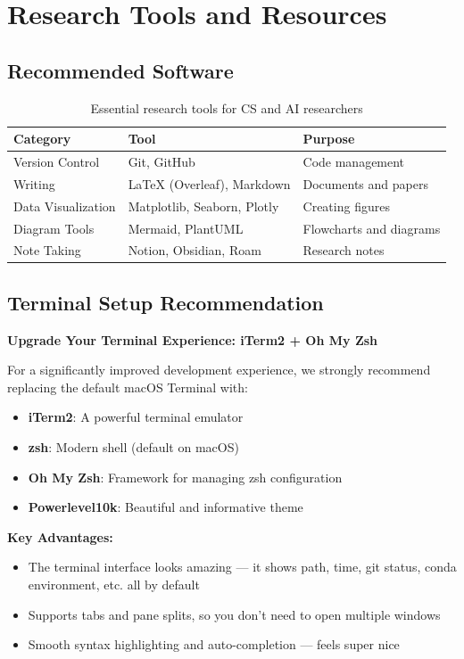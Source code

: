 \documentclass[11pt,a4paper]{article}
\begin{document}
\section{Research Tools and Resources}

\subsection{Recommended Software}
\begin{table}[H]
\centering
\begin{tabular}{@{}lll@{}}
\toprule
\textbf{Category} & \textbf{Tool} & \textbf{Purpose} \\
\midrule
Version Control & Git, GitHub & Code management \\
Writing & LaTeX (Overleaf), Markdown & Documents and papers \\
Data Visualization & Matplotlib, Seaborn, Plotly & Creating figures \\
Diagram Tools & Mermaid, PlantUML & Flowcharts and diagrams \\
Note Taking & Notion, Obsidian, Roam & Research notes \\
\bottomrule
\end{tabular}
\caption{Essential research tools for CS and AI researchers}
\end{table}

\subsection{Terminal Setup Recommendation}

\textbf{Upgrade Your Terminal Experience: iTerm2 + Oh My Zsh}

For a significantly improved development experience, we strongly recommend replacing the default macOS Terminal with:
\begin{itemize}
    \item \textbf{iTerm2}: A powerful terminal emulator
    \item \textbf{zsh}: Modern shell (default on macOS)
    \item \textbf{Oh My Zsh}: Framework for managing zsh configuration
    \item \textbf{Powerlevel10k}: Beautiful and informative theme
\end{itemize}

\textbf{Key Advantages:}
\begin{itemize}
    \item The terminal interface looks amazing — it shows path, time, git status, conda environment, etc. all by default
    \item Supports tabs and pane splits, so you don't need to open multiple windows
    \item Smooth syntax highlighting and auto-completion — feels super nice
\end{itemize}
\end{document}
